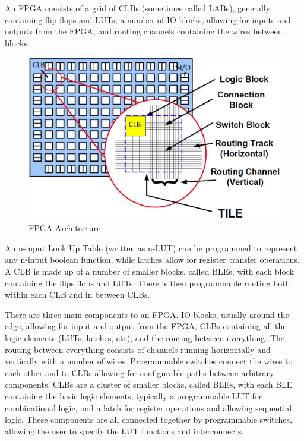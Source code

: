 \documentclass[12pt,drafta4paper,oneside]{memoir} %
\begin{document}
An \ac{FPGA} consists of a grid of \acp{CLB} (sometimes called \acp{LAB}), generally containing flip flops and \acp{LUT}; a number of \ac{IO} blocks, allowing for inputs and outputs from the \ac{FPGA}; and routing channels containing the wires between blocks.
\begin{figure}
    \includegraphics[width=\textwidth]{images/fpga-arch.png}
    \caption{FPGA Architecture\cite{WiltonLecture}}
    \label{FPGAArch}
\end{figure}
An n-input Look Up Table (written as n-LUT) can be programmed to represent any n-input boolean function, while latches allow for register transfer operations. A \ac{CLB} is made up of a number of smaller blocks, called \acp{BLE}, with each block containing the flips flops and \acp{LUT}. There is then programmable routing both within each \ac{CLB} and in between \acp{CLB}.


There are three main components to an \ac{FPGA}. \ac{IO} blocks, usually around the edge, allowing for input and output from the \ac{FPGA}, \acp{CLB} containing all the logic elements (\acp{LUT}, latches, etc), and the routing between everything.
The routing between everything consists of channels running horizontally and vertically with a number of wires. Programmable switches connect the wires to each other and to \acp{CLB} allowing for configurable paths between arbitrary components.
\acp{CLB} are a cluster of smaller blocks, called \acp{BLE}, with each \ac{BLE} containing the basic logic elements, typically a programmable \ac{LUT} for combinational logic, and a latch for register operations and allowing sequential logic. These components are all connected together by programmable switches, allowing the user to specify the \ac{LUT} functions and interconnects.
\end{document}
